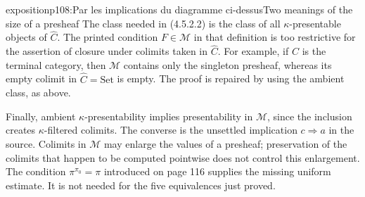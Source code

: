 \begin{dcomment}{exposition}{p108:Par les implications du diagramme ci-dessus}{Two meanings of the size of a presheaf}
The class needed in (4.5.2.2) is the class of all $\kappa$-presentable objects of $\widehat C$. The printed condition $F\in\mathcal M$ in that definition is too restrictive for the assertion of closure under colimits taken in $\widehat C$. For example, if $C$ is the terminal category, then $\mathcal M$ contains only the singleton presheaf, whereas its empty colimit in $\widehat C=\mathrm{Set}$ is empty. The proof is repaired by using the ambient class, as above.

Finally, ambient $\kappa$-presentability implies presentability in $\mathcal M$, since the inclusion creates $\kappa$-filtered colimits. The converse is the unsettled implication $c\Rightarrow a$ in the source. Colimits in $\mathcal M$ may enlarge the values of a presheaf; preservation of the colimits that happen to be computed pointwise does not control this enlargement. The condition $\pi^{\pi_0}=\pi$ introduced on page 116 supplies the missing uniform estimate. It is not needed for the five equivalences just proved.
\end{dcomment}

